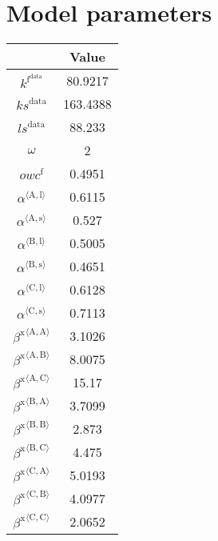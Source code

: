 \section{Model parameters}


\begin{tabular}{c|c|}
  & Value\\
\hline
$k^{\mathrm{f}^{\mathrm{data}}}$ & 80.9217 \\
${k\!s}^{\mathrm{data}}$ & 163.4388 \\
${l\!s}^{\mathrm{data}}$ & 88.233 \\
$\omega$ & 2 \\
${o\!w\!c}^{\mathrm{f}}$ & 0.4951 \\
${\alpha}^{\langle \mathrm{\mathrm{A}},\mathrm{\mathrm{l}}\rangle}$ & 0.6115 \\
${\alpha}^{\langle \mathrm{\mathrm{A}},\mathrm{\mathrm{s}}\rangle}$ & 0.527 \\
${\alpha}^{\langle \mathrm{\mathrm{B}},\mathrm{\mathrm{l}}\rangle}$ & 0.5005 \\
${\alpha}^{\langle \mathrm{\mathrm{B}},\mathrm{\mathrm{s}}\rangle}$ & 0.4651 \\
${\alpha}^{\langle \mathrm{\mathrm{C}},\mathrm{\mathrm{l}}\rangle}$ & 0.6128 \\
${\alpha}^{\langle \mathrm{\mathrm{C}},\mathrm{\mathrm{s}}\rangle}$ & 0.7113 \\
${\beta^{\mathrm{x}}}^{\langle \mathrm{\mathrm{A}},\mathrm{\mathrm{A}}\rangle}$ & 3.1026 \\
${\beta^{\mathrm{x}}}^{\langle \mathrm{\mathrm{A}},\mathrm{\mathrm{B}}\rangle}$ & 8.0075 \\
${\beta^{\mathrm{x}}}^{\langle \mathrm{\mathrm{A}},\mathrm{\mathrm{C}}\rangle}$ & 15.17 \\
${\beta^{\mathrm{x}}}^{\langle \mathrm{\mathrm{B}},\mathrm{\mathrm{A}}\rangle}$ & 3.7099 \\
${\beta^{\mathrm{x}}}^{\langle \mathrm{\mathrm{B}},\mathrm{\mathrm{B}}\rangle}$ & 2.873 \\
${\beta^{\mathrm{x}}}^{\langle \mathrm{\mathrm{B}},\mathrm{\mathrm{C}}\rangle}$ & 4.475 \\
${\beta^{\mathrm{x}}}^{\langle \mathrm{\mathrm{C}},\mathrm{\mathrm{A}}\rangle}$ & 5.0193 \\
${\beta^{\mathrm{x}}}^{\langle \mathrm{\mathrm{C}},\mathrm{\mathrm{B}}\rangle}$ & 4.0977 \\
${\beta^{\mathrm{x}}}^{\langle \mathrm{\mathrm{C}},\mathrm{\mathrm{C}}\rangle}$ & 2.0652 \\

\end{tabular}
